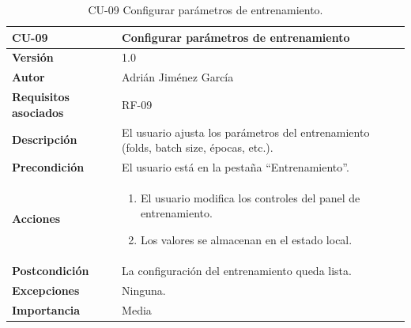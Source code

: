 \begin{table}[p]
	\centering
	\begin{tabularx}{\linewidth}{ p{} X }
		\toprule
		\textbf{CU-09}    & \textbf{Configurar parámetros de entrenamiento}\\
		\toprule
		\textbf{Versión}              & 1.0 \\
		\textbf{Autor}                & Adrián Jiménez García \\
		\textbf{Requisitos asociados} & RF-09 \\
		\textbf{Descripción}          & El usuario ajusta los parámetros del entrenamiento (folds, batch size, épocas, etc.). \\
		\textbf{Precondición}         & El usuario está en la pestaña ``Entrenamiento''. \\
		\textbf{Acciones}             &
		\begin{enumerate}
			\def\labelenumi{\arabic{enumi}.}
			\tightlist
			\item El usuario modifica los controles del panel de entrenamiento.
			\item Los valores se almacenan en el estado local.
		\end{enumerate}\\
		\textbf{Postcondición}        & La configuración del entrenamiento queda lista. \\
		\textbf{Excepciones}          & Ninguna. \\
		\textbf{Importancia}          & Media \\
		\bottomrule
	\end{tabularx}
	\caption{CU-09 Configurar parámetros de entrenamiento.}
\end{table}

